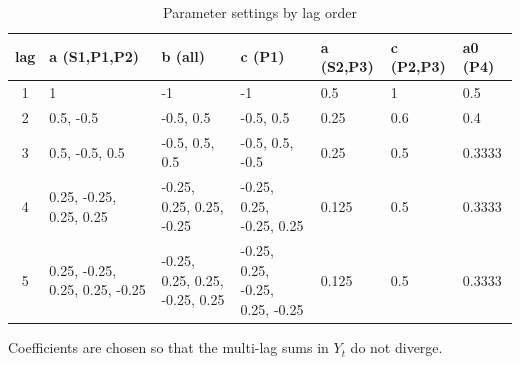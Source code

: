 \begin{table}[htbp]
\centering
\caption{Parameter settings by lag order}
\label{tab:params}
\small
\begin{tabular}{cllllll}
\toprule
lag & a (S1,P1,P2) & b (all) & c (P1) & a (S2,P3) & c (P2,P3) & a0 (P4) \\
\midrule
1 & 1 & -1 & -1 & 0.5 & 1 & 0.5 \\
2 & 0.5, -0.5 & -0.5, 0.5 & -0.5, 0.5 & 0.25 & 0.6 & 0.4 \\
3 & 0.5, -0.5, 0.5 & -0.5, 0.5, 0.5 & -0.5, 0.5, -0.5 & 0.25 & 0.5 & 0.3333 \\
4 & 0.25, -0.25, 0.25, 0.25 & -0.25, 0.25, 0.25, -0.25 & -0.25, 0.25, -0.25, 0.25 & 0.125 & 0.5 & 0.3333 \\
5 & 0.25, -0.25, 0.25, 0.25, -0.25 & -0.25, 0.25, 0.25, -0.25, 0.25 & -0.25, 0.25, -0.25, 0.25, -0.25 & 0.125 & 0.5 & 0.3333 \\
\bottomrule
\end{tabular}

\begin{minipage}{\linewidth}\footnotesize
Coefficients are chosen so that the multi-lag sums in $Y_t$ do not diverge.
\end{minipage}
\end{table}
